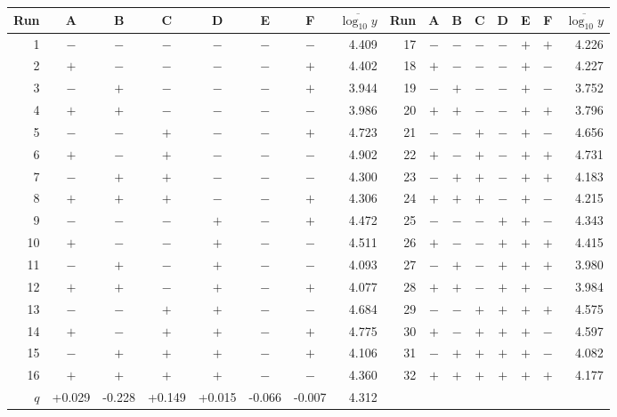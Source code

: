 \begin{tabular}{@{}rccccccr@{\qquad}rccccccr@{}}
\toprule
Run & A & B & C & D & E & F & $\overline{\log_{10} y}$ & Run & A & B & C & D & E & F & $\overline{\log_{10} y}$ \\
\midrule
1 & $-$ & $-$ & $-$ & $-$ & $-$ & $-$ & 4.409 & 17 & $-$ & $-$ & $-$ & $-$ & $+$ & $+$ & 4.226 \\
2 & $+$ & $-$ & $-$ & $-$ & $-$ & $+$ & 4.402 & 18 & $+$ & $-$ & $-$ & $-$ & $+$ & $-$ & 4.227 \\
3 & $-$ & $+$ & $-$ & $-$ & $-$ & $+$ & 3.944 & 19 & $-$ & $+$ & $-$ & $-$ & $+$ & $-$ & 3.752 \\
4 & $+$ & $+$ & $-$ & $-$ & $-$ & $-$ & 3.986 & 20 & $+$ & $+$ & $-$ & $-$ & $+$ & $+$ & 3.796 \\
5 & $-$ & $-$ & $+$ & $-$ & $-$ & $+$ & 4.723 & 21 & $-$ & $-$ & $+$ & $-$ & $+$ & $-$ & 4.656 \\
6 & $+$ & $-$ & $+$ & $-$ & $-$ & $-$ & 4.902 & 22 & $+$ & $-$ & $+$ & $-$ & $+$ & $+$ & 4.731 \\
7 & $-$ & $+$ & $+$ & $-$ & $-$ & $-$ & 4.300 & 23 & $-$ & $+$ & $+$ & $-$ & $+$ & $+$ & 4.183 \\
8 & $+$ & $+$ & $+$ & $-$ & $-$ & $+$ & 4.306 & 24 & $+$ & $+$ & $+$ & $-$ & $+$ & $-$ & 4.215 \\
9 & $-$ & $-$ & $-$ & $+$ & $-$ & $+$ & 4.472 & 25 & $-$ & $-$ & $-$ & $+$ & $+$ & $-$ & 4.343 \\
10 & $+$ & $-$ & $-$ & $+$ & $-$ & $-$ & 4.511 & 26 & $+$ & $-$ & $-$ & $+$ & $+$ & $+$ & 4.415 \\
11 & $-$ & $+$ & $-$ & $+$ & $-$ & $-$ & 4.093 & 27 & $-$ & $+$ & $-$ & $+$ & $+$ & $+$ & 3.980 \\
12 & $+$ & $+$ & $-$ & $+$ & $-$ & $+$ & 4.077 & 28 & $+$ & $+$ & $-$ & $+$ & $+$ & $-$ & 3.984 \\
13 & $-$ & $-$ & $+$ & $+$ & $-$ & $-$ & 4.684 & 29 & $-$ & $-$ & $+$ & $+$ & $+$ & $+$ & 4.575 \\
14 & $+$ & $-$ & $+$ & $+$ & $-$ & $+$ & 4.775 & 30 & $+$ & $-$ & $+$ & $+$ & $+$ & $-$ & 4.597 \\
15 & $-$ & $+$ & $+$ & $+$ & $-$ & $+$ & 4.106 & 31 & $-$ & $+$ & $+$ & $+$ & $+$ & $-$ & 4.082 \\
16 & $+$ & $+$ & $+$ & $+$ & $-$ & $-$ & 4.360 & 32 & $+$ & $+$ & $+$ & $+$ & $+$ & $+$ & 4.177 \\
\midrule
$q$ & +0.029 & -0.228 & +0.149 & +0.015 & -0.066 & -0.007 & 4.312 &  &  &  &  &  &  &  &  \\
\bottomrule
\end{tabular}
